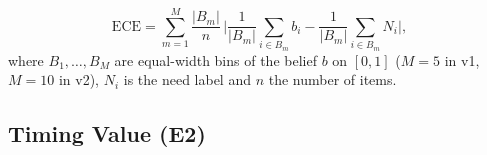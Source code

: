 \begin{equation}
\mathrm{ECE}=\sum_{m=1}^{M}\frac{|B_m|}{n}\,\Big|\frac{1}{|B_m|}\sum_{i\in B_m}b_i-\frac{1}{|B_m|}\sum_{i\in B_m}N_i\Big|,
\label{eq:ece}
\end{equation}
where $B_1,\dots,B_M$ are equal-width bins of the belief $b$ on $[0,1]$
($M=5$ in v1, $M=10$ in v2), $N_i$ is the need label and $n$ the number of
items.

\subsection{Timing Value (E2)}\label{sec:v1-e2}

